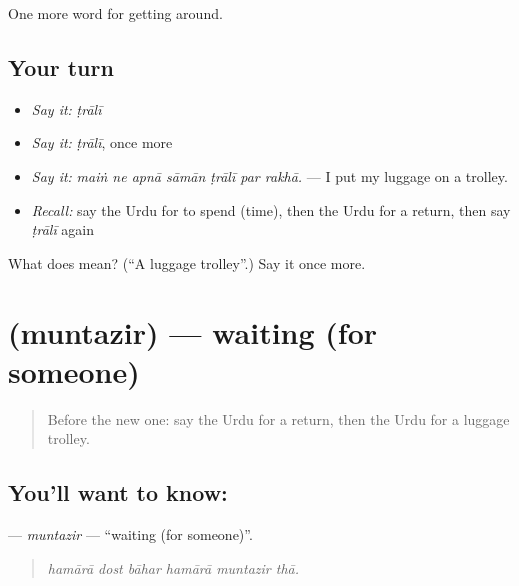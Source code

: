 \begin{grammarlens}[title={What you've built}]
One more word for getting around.
\end{grammarlens}

\subsection*{Your turn}
\begin{itemize}
\raggedright
  \item \emph{Say it:} \emph{ṭrālī}
  \item \emph{Say it:} \emph{ṭrālī}, once more
  \item \emph{Say it:} \emph{maiṅ ne apnā sāmān ṭrālī par rakhā.} — I put my luggage on a trolley.
  \item \emph{Recall:} say the Urdu for to spend (time), then the Urdu for a return, then say \emph{ṭrālī} again
\end{itemize}

\begin{tcolorbox}[breakable,colback=teal!4,colframe=teal!35!black,title={Before you move on}]
What does  mean? (\textquotedblleft{}A luggage trolley\textquotedblright{}.) Say it once more.
\end{tcolorbox}
\section[\texorpdfstring{\ur{منتظر} (muntazir)}{منتظر (muntazir)}]{ (muntazir) — waiting (for someone)}

\label{lesson:UR-C401-muntazir}



\begin{quote}
Before the new one: say the Urdu for a return, then the Urdu for a luggage trolley.
\end{quote}

\subsection*{You'll want to know: }
\textbf{} — \emph{muntazir} — \textquotedblleft{}waiting (for someone)\textquotedblright{}.

\begin{quote}
     
\end{quote}

\begin{quote}
\emph{hamārā dost bāhar hamārā muntazir thā.}
\end{quote}

